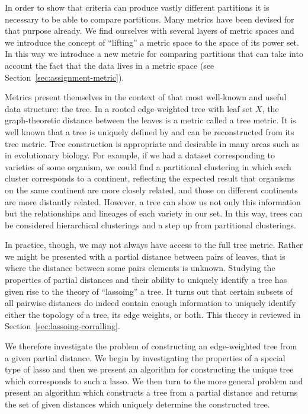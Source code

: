 In order to show that criteria can produce vastly different partitions it is
necessary to be able to compare partitions.  Many metrics have been devised
for that purpose already.  We find ourselves with several layers of metric
spaces and we introduce the concept of ``lifting'' a metric space to the space
of its power set.  In this way we introduce a new metric for comparing
partitions that can take into account the fact that the data lives in a metric
space (see Section~\ref{sec:assignment-metric}).

Metrics present themselves in the context of that most well-known and useful
data structure: the tree.  In a rooted edge-weighted tree with leaf set $X$,
the graph-theoretic distance between the leaves is a metric called a tree
metric.  It is well known that a tree is uniquely defined by and can be
reconstructed from its tree metric.  Tree construction is appropriate and
desirable in many areas such as in evolutionary biology.  For example, if we
had a dataset corresponding to varieties of some organism, we could find a
partitional clustering in which each cluster corresponds to a continent,
reflecting the expected result that organisms on the same continent are more
closely related, and those on different continents are more distantly related.
However, a tree can show us not only this information but the relationships
and lineages of each variety in our set.  In this way, trees can be considered
hierarchical clusterings and a step up from partitional clusterings.

In practice, though, we may not always have access to the full tree metric.
Rather we might be presented with a partial distance between pairs of leaves,
that is where the distance between some pairs elements is unknown.  Studying
the properties of partial distances and their ability to uniquely identify a
tree has given rise to the theory of ``lassoing'' a tree.  It turns out that
certain subsets of all pairwise distances do indeed contain enough information
to uniquely identify either the topology of a tree, its edge weights, or
both.  This theory is reviewed in Section~\ref{sec:lassoing-corralling}.

We therefore investigate the problem of constructing an edge-weighted tree
from a given partial distance.  We begin by investigating the properties of a
special type of lasso and then we present an algorithm for constructing the
unique tree which corresponds to such a lasso.  We then turn to the more
general problem and present an algorithm which constructs a tree from a
partial distance and returns the set of given distances which uniquely
determine the constructed tree.

